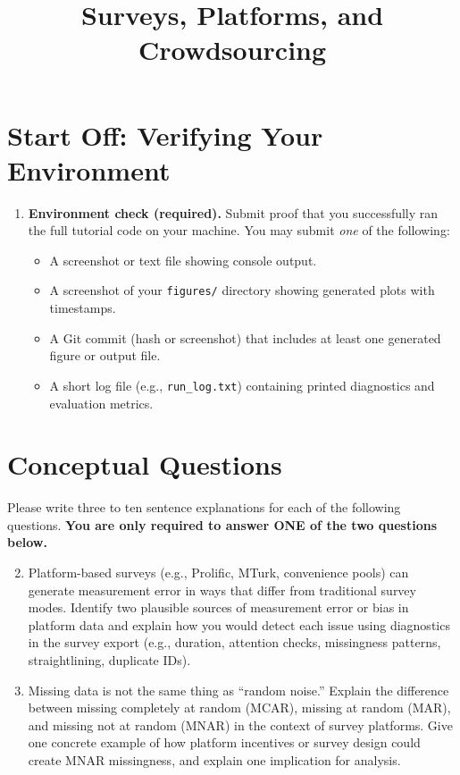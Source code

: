 \documentclass[11pt]{article}
\title{ Surveys, Platforms, and Crowdsourcing}
\author{ }
\date{ }
\begin{document}
\maketitle

\section*{Start Off: Verifying Your Environment}

\begin{enumerate}
\item \textbf{Environment check (required).}  
Submit proof that you successfully ran the full tutorial code on your machine. You may submit \emph{one} of the following:
\begin{itemize}
  \item A screenshot or text file showing console output.
  \item A screenshot of your \texttt{figures/} directory showing generated plots with timestamps.
  \item A Git commit (hash or screenshot) that includes at least one generated figure or output file.
  \item A short log file (e.g., \texttt{run\_log.txt}) containing printed diagnostics and evaluation metrics.
\end{itemize}
\end{enumerate}

\section*{Conceptual Questions}
Please write three to ten sentence explanations for each of the following questions. \textbf{You are only required to answer ONE of the two questions below.} \bigskip
 
\begin{enumerate}
\setcounter{enumi}{1}

\item Platform-based surveys (e.g., Prolific, MTurk, convenience pools) can generate measurement error in ways that differ from traditional survey modes. Identify two plausible sources of measurement error or bias in platform data and explain how you would detect each issue using diagnostics in the survey export (e.g., duration, attention checks, missingness patterns, straightlining, duplicate IDs).

\item Missing data is not the same thing as ``random noise.'' Explain the difference between missing completely at random (MCAR), missing at random (MAR), and missing not at random (MNAR) in the context of survey platforms. Give one concrete example of how platform incentives or survey design could create MNAR missingness, and explain one implication for analysis.

  \end{enumerate}
\end{document}
